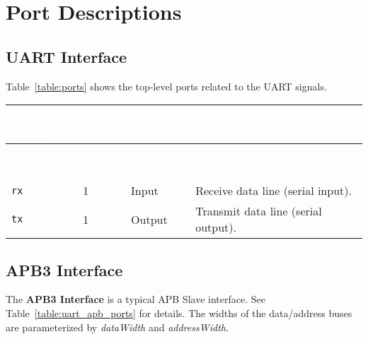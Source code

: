 \section{Port Descriptions}

\subsection{UART Interface}

Table~\ref{table:ports} shows the top-level ports related to the UART signals.

\renewcommand*{\arraystretch}{1.3}
\begingroup
\small
{}

\begin{longtable}[H]{
  | p{}
  | p{}
  | p{}
  | p{} |
}
\hline
\rowcolor{gray}
\textcolor{white}{\textbf{Port Name}} &
\textcolor{white}{\textbf{Width}} &
\textcolor{white}{\textbf{Direction}} &
\textcolor{white}{\textbf{Description}} \\ 
\hline
\endfirsthead

\hline
\rowcolor{gray}
\textcolor{white}{\textbf{Port Name}} &
\textcolor{white}{\textbf{Width}} &
\textcolor{white}{\textbf{Direction}} &
\textcolor{white}{\textbf{Description}} \\ 
\hline
\endhead

\hline
\endfoot

\texttt{rx} &
1 &
Input &
Receive data line (serial input). \\ \hline

\texttt{tx} &
1 &
Output &
Transmit data line (serial output). \\ \hline

\end{longtable}
\label{table:ports}
\endgroup

\subsection{APB3 Interface}

The \textbf{APB3 Interface} is a typical APB Slave interface. See Table~\ref{table:uart_apb_ports} for details. The widths of the data/address buses are parameterized by \textit{dataWidth} and \textit{addressWidth}.

\renewcommand*{\arraystretch}{1.3}
\begingroup
\small
{}

